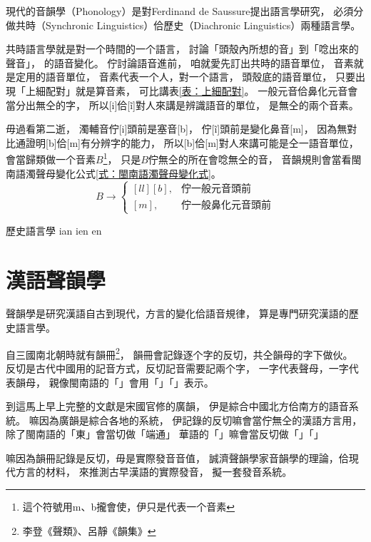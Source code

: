 現代的音韻學（Phonology）是對Ferdinand de Saussure\cite{de2011course}提出語言學研究，
必須分做共時（Synchronic Linguistics）佮歷史（Diachronic Linguistics）兩種語言學。

共時語言學就是對一个時間的一个語言，
討論「頭殼內所想的音」到「唸出來的聲音」，
的語音變化。
佇討論語音進前，
咱就愛先訂出共時的語音單位，
音素就是定用的語音單位，
音素代表一个人，對一个語言，
頭殼底的語音單位，
只要出現「上細配對」就是算音素，
可比講表\ref{表：上細配對}。
一般元音佮鼻化元音會當分出無仝的字，
所以[i]佮[ĩ]對人來講是辨識語音的單位，
是無仝的兩个音素。

毋過看第二逝，
濁輔音佇[i]頭前是塞音[b]，
佇[ĩ]頭前是變化鼻音[m]，
因為無對比通證明[b]佮[m]有分辨字的能力，
所以[b]佮[m]對人來講可能是仝一語音單位，
會當歸類做一个音素$B$\footnote{這个符號用m、b攏會使，伊只是代表一个音素}，
只是$B$佇無仝的所在會唸無仝的音，
音韻規則會當看閩南語濁聲母變化公式\ref{式：閩南語濁聲母變化式}。
\begin{equation}
\label{式：閩南語濁聲母變化式}
B\rightarrow\left\{\begin{matrix}[ll]
[b], & 佇一般元音頭前\\ 
[m], & 佇一般鼻化元音頭前
\end{matrix}\right.
\end{equation}

歷史語言學
ian ien en

\section{漢語聲韻學}
\label{節：漢語聲韻學}
聲韻學是研究漢語自古到現代，方言的變化佮語音規律，
算是專門研究漢語的歷史語言學。

自三國南北朝時就有韻冊\footnote{李登《聲類》、呂靜《韻集》}，
韻冊會記錄逐个字的反切，共仝韻母的字下做伙。
反切是古代中國用的記音方式，反切記音需要記兩个字，
一字代表聲母，一字代表韻母，
親像閩南語的「」會用「」「」表示。%

到這馬上早上完整的文獻是宋國官修的廣韻\cite{2002廣韻注漳州漢音}\cite{2010新校互註宋本廣韻}，
伊是綜合中國北方佮南方的語音系統。
嘛因為廣韻是綜合各地的系統，
伊記錄的反切嘛會當佇無仝的漢語方言用，
除了閩南語的「東」會當切做「端通」
華語的「」嘛會當反切做「」「」

嘛因為韻冊記錄是反切，毋是實際發音音值，
誠濟聲韻學家音韻學的理論，佮現代方言的材料，
來推測古早漢語的實際發音，
擬一套發音系統。

